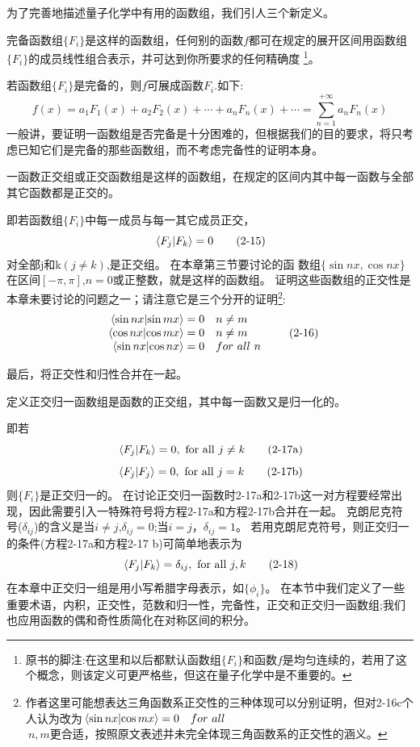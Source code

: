 为了完善地描述量子化学中有用的函数组，我们引人三个新定义。

\begin{definition}[完备函数集]
    完备函数组$\{F_i\}$是这样的函数组，任何别的函数$f$都可在规定的展开区间用函数组$\{F_i\}$的成员线性组合表示，并可达到你所要求的任何精确度
    \footnote{原书的脚注:在这里和以后都默认函数组$\{F_i\}$和函数$f$是均匀连续的，若用了这个概念，则该定义可更严格些，但这在量子化学中是不重要的。}。
\end{definition}

若函数组$\{F_i\}$是完备的，则$f$可展成函数$F_i$.如下:
\[f(x)=a_1F_1(x)+a_2F_2(x)+ \cdots +a_nF_n(x)+ \cdots =\sum_{n=1}^{+\infty}a_nF_n(x) \tag{2-14}\]
一般讲，要证明一函数组是否完备是十分困难的，但根据我们的目的要求，将只考虑已知它们是完备的那些函数组，而不考虑完备性的证明本身。

\begin{definition}[正交完备函数集]
    一函数正交组或正交函数组是这样的函数组，在规定的区间内其中每一函数与全部其它函数都是正交的。
\end{definition}

即若函数组$\{F_i\}$中每一成员与每一其它成员正交，
\[\bra*{F_j}\ket*{F_k}=0 \tag{2-15}\]
对全部j和k$(j \neq k)$,是正交组。
在本章第三节要讨论的函
数组$\{\sin nx,\cos nx\}$在区间$[-\pi,\pi]$,$n=0$或正整数，就是这样的函数组。
证明这些函数组的正交性是本章未要讨论的问题之一；请注意它是三个分开的证明\footnote{作者这里可能想表达三角函数系正交性的三种体现可以分别证明，但对2-16c个人认为改为$\bra*{\sin nx}\ket*{\cos mx}=0 \quad for \ all$ \\ $ \ n,m$更合适，按照原文表述并未完全体现三角函数系的正交性的涵义。}:
\[
\begin{array}{rl}
    \bra*{\sin nx}\ket*{\sin mx}=0 & n \neq m \\
    \bra*{\cos nx}\ket*{\cos mx}=0 & n \neq m \\
    \bra*{\sin nx}\ket*{\cos nx}=0 & for \ all \ n
\end{array}    
\tag{2-16}
\]

最后，将正交性和归性合并在一起。

\begin{definition}[正交归一完备函数集]
    定义正交归一函数组是函数的正交组，其中每一函数又是归一化的。
\end{definition}

即若
\[\bra*{F_j}\ket*{F_k}=0, \ \text{for all} \ j \neq k \tag{2-17a}\]
\[\bra*{F_j}\ket*{F_j}=0, \ \text{for all} \ j=k \tag{2-17b}\]
则$\{F_i\}$是正交归一的。
在讨论正交归一函数时2-17a和2-17b这一对方程要经常出现，因此需要引入一特殊符号将方程2-17a和方程2-17b合并在一起。
克朗尼克符号($\delta_{ij}$)的含义是当$i \neq j$,$\delta_{ij}=0$;当$i=j$，$\delta_{ij}=1$。
若用克朗尼克符号，则正交归一的条件(方程2-17a和方程2-17 b)可简单地表示为
\[\bra*{F_j}\ket*{F_k}=\delta_{ij}, \ \text{for all} \ j,k \tag{2-18}\]
在本章中正交归一组是用小写希腊字母表示，如$\{\phi_i\}$。
在本节中我们定义了一些重要术语，内积，正交性，范数和归一性，完备性，正交和正交归一函数组;我们也应用函数的偶和奇性质简化在对称区间的积分。


